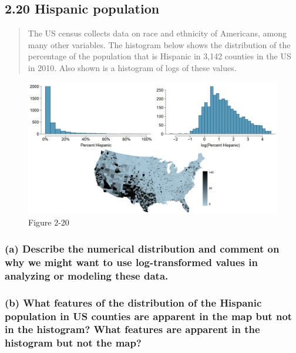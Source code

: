 \documentclass[
]{article}
\begin{document}
\subsection{2.20 Hispanic population}\label{hispanic-population}

\begin{quote}
The US census collects data on race and ethnicity of Americans, among
many other variables. The histogram below shows the distribution of the
percentage of the population that is Hispanic in 3,142 counties in the
US in 2010. Also shown is a histogram of logs of these values.
\end{quote}

\begin{figure}
\centering
\includegraphics{./assets/2-20.jpg}
\caption{Figure 2-20}
\end{figure}

\subsubsection{(a) Describe the numerical distribution and comment on
why we might want to use log-transformed values in analyzing or modeling
these
data.}\label{a-describe-the-numerical-distribution-and-comment-on-why-we-might-want-to-use-log-transformed-values-in-analyzing-or-modeling-these-data.}

\subsubsection{(b) What features of the distribution of the Hispanic
population in US counties are apparent in the map but not in the
histogram? What features are apparent in the histogram but not the
map?}\label{b-what-features-of-the-distribution-of-the-hispanic-population-in-us-counties-are-apparent-in-the-map-but-not-in-the-histogram-what-features-are-apparent-in-the-histogram-but-not-the-map}
\end{document}
